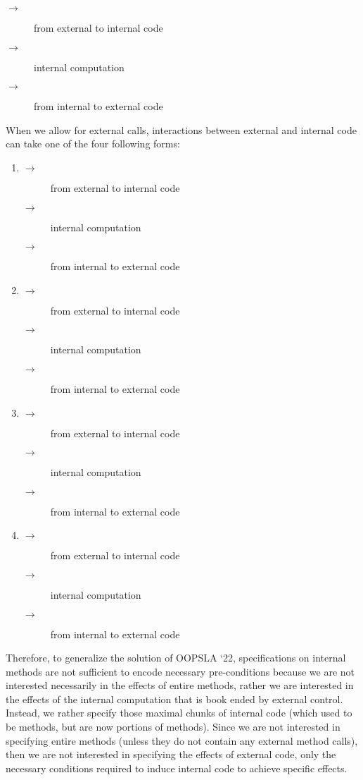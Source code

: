 \documentclass[11pt]{article} %
\theoremstyle{definition}
\begin{document}
{
\newcommand{\callHL}{{\textbf{\color{red}{call}}}\xspace}
\newcommand{\returnHL}{{\textbf{\color{blue}{return}}}\xspace}
\begin{description}
\item[$\rightarrow$]
\callHL from external to internal code 
\item[$\rightarrow$]
internal computation
\item[$\rightarrow$]
\returnHL from internal to external code
\end{description}
When we allow for external calls, interactions between external and internal code 
can take one of the four following forms:
\begin{enumerate}
\item
	\begin{description}
	\item[$\rightarrow$]
	\callHL from external to internal code 
	\item[$\rightarrow$]
	internal computation
	\item[$\rightarrow$]
	\returnHL from internal to external code
	\end{description}
\item
	\begin{description}
	\item[$\rightarrow$]
	\callHL from external to internal code 
	\item[$\rightarrow$]
	internal computation
	\item[$\rightarrow$]
	\callHL from internal to external code
	\end{description}
\item
	\begin{description}
	\item[$\rightarrow$]
	\returnHL from external to internal code 
	\item[$\rightarrow$]
	internal computation
	\item[$\rightarrow$]
	\returnHL from internal to external code
	\end{description}
\item
	\begin{description}
	\item[$\rightarrow$]
	\returnHL from external to internal code 
	\item[$\rightarrow$]
	internal computation
	\item[$\rightarrow$]
	\callHL from internal to external code
	\end{description}
\end{enumerate}}
Therefore, to generalize the solution of OOPSLA `22, specifications 
on internal methods are not sufficient to encode necessary pre-conditions
because we are not interested necessarily in the effects of entire
methods, rather we are interested in the effects of the internal computation
that is book ended by external control. Instead, we rather specify 
those maximal chunks of internal code (which used to be methods, but are 
now portions of methods). Since we are not interested in specifying 
entire methods (unless they do not contain any external method calls),
then we are not interested in specifying the effects of external code,
only the necessary conditions required to induce internal code to 
achieve specific effects.
\end{document}
